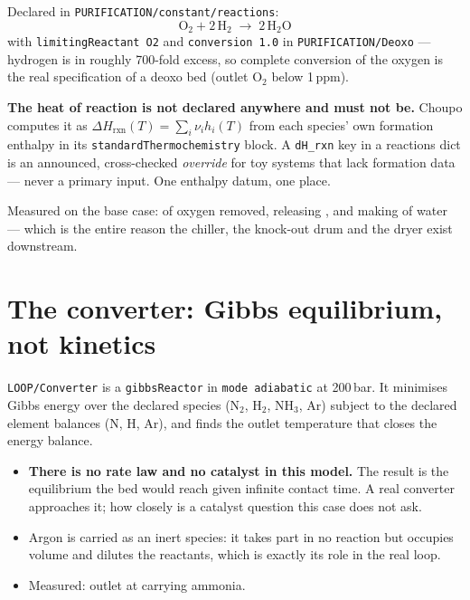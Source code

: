 \documentclass[11pt,a4paper]{article}
\begin{document}
Declared in \texttt{PURIFICATION/constant/reactions}:
\[
  \mathrm{O_2} + 2\,\mathrm{H_2} \;\longrightarrow\; 2\,\mathrm{H_2O}
\]
with \texttt{limitingReactant O2} and \texttt{conversion 1.0} in
\texttt{PURIFICATION/Deoxo} --- hydrogen is in roughly 700-fold excess, so
complete conversion of the oxygen is the real specification of a deoxo bed
(outlet O$_2$ below 1\,ppm).

\begin{caveat}
\textbf{The heat of reaction is not declared anywhere and must not be.} Choupo
computes it as $\Delta H_{\mathrm{rxn}}(T) = \sum_i \nu_i h_i(T)$ from each
species' own formation enthalpy in its \texttt{standardThermochemistry} block.
A \texttt{dH\_rxn} key in a reactions dict is an announced, cross-checked
\emph{override} for toy systems that lack formation data --- never a primary
input. One enthalpy datum, one place.
\end{caveat}

Measured on the base case:  of oxygen removed, releasing
, and making  of water --- which is
the entire reason the chiller, the knock-out drum and the dryer exist
downstream.

\section{The converter: Gibbs equilibrium, not kinetics}

\texttt{LOOP/Converter} is a \texttt{gibbsReactor} in \texttt{mode adiabatic}
at 200\,bar. It minimises Gibbs energy over the declared species
(N$_2$, H$_2$, NH$_3$, Ar) subject to the declared element balances
(N, H, Ar), and finds the outlet temperature that closes the energy balance.

\begin{itemize}[leftmargin=*]
\item \textbf{There is no rate law and no catalyst in this model.} The result
      is the equilibrium the bed would reach given infinite contact time. A
      real converter approaches it; how closely is a catalyst question this
      case does not ask.
\item Argon is carried as an inert species: it takes part in no reaction but
      occupies volume and dilutes the reactants, which is exactly its role in
      the real loop.
\item Measured: outlet at  carrying
       ammonia.
\end{itemize}
\end{document}
